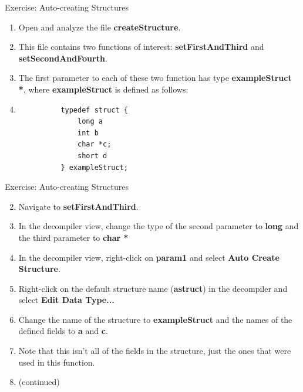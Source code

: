 \documentclass{beamer}
\begin{document}
\begin{frame}[fragile]
\begin{block}{Exercise: Auto-creating Structures}
\begin{enumerate}
\item Open and analyze the file \textbf{createStructure}.
\item[] This file contains two functions of interest: \textbf{setFirstAndThird} and \textbf{setSecondAndFourth}. 
\item[] The first parameter to each of these two function has type \textbf{exampleStruct *}, where \textbf{exampleStruct} is defined as follows:
\item[] \begin{verbatim}
          typedef struct {
              long a
              int b
              char *c;
              short d
          } exampleStruct;
\end{verbatim}
\end{enumerate}
\end{block}
\end{frame}

\begin{frame}
\begin{block}{Exercise: Auto-creating Structures}
\begin{enumerate}
\setcounter{enumi}{1}
\item Navigate to \textbf{setFirstAndThird}. 
\item In the decompiler view, change the type of the second parameter to \textbf{long} and the third parameter to \textbf{char *}
\item In the decompiler view, right-click on \textbf{param1} and select \textbf{Auto Create Structure}.
\item Right-click on the default structure name (\textbf{astruct}) in the decompiler and select \textbf{Edit Data Type...}
\item Change the name of the structure to \textbf{exampleStruct} and the names of the defined fields to \textbf{a} and \textbf{c}.
\item Note that this isn't all of the fields in the structure, just the ones that were used in this function.
\item[] (continued)
\end{enumerate}
\end{block}
\end{frame}
\end{document}
